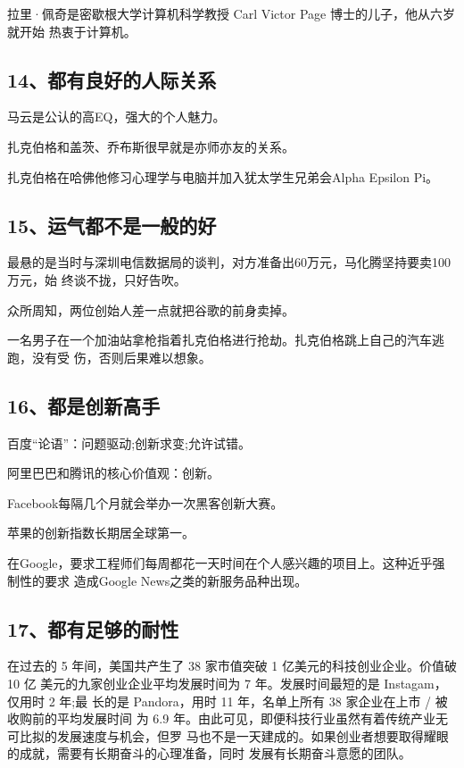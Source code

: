 \documentclass[11pt]{ctexart}
\begin{document}
{{{{拉里·佩奇是密歇根大学计算机科学教授 Carl Victor Page 博士的儿子，他从六岁就开始
热衷于计算机。

\subsection{14、都有良好的人际关系}
\label{sec:org9c956d6}

马云是公认的高EQ，强大的个人魅力。

扎克伯格和盖茨、乔布斯很早就是亦师亦友的关系。

扎克伯格在哈佛他修习心理学与电脑并加入犹太学生兄弟会Alpha Epsilon Pi。

\subsection{15、运气都不是一般的好}
\label{sec:orgf60fccc}

最悬的是当时与深圳电信数据局的谈判，对方准备出60万元，马化腾坚持要卖100万元，始
终谈不拢，只好告吹。

众所周知，两位创始人差一点就把谷歌的前身卖掉。

一名男子在一个加油站拿枪指着扎克伯格进行抢劫。扎克伯格跳上自己的汽车逃跑，没有受
伤，否则后果难以想象。

\subsection{16、都是创新高手}
\label{sec:org902fa3f}

百度“论语”：问题驱动;创新求变;允许试错。

阿里巴巴和腾讯的核心价值观：创新。

Facebook每隔几个月就会举办一次黑客创新大赛。

苹果的创新指数长期居全球第一。

在Google，要求工程师们每周都花一天时间在个人感兴趣的项目上。这种近乎强制性的要求
造成Google News之类的新服务品种出现。

\subsection{17、都有足够的耐性}
\label{sec:org9df2e61}

在过去的 5 年间，美国共产生了 38 家市值突破 1 亿美元的科技创业企业。价值破 10 亿
美元的九家创业企业平均发展时间为 7 年。发展时间最短的是 Instagam，仅用时 2 年;最
长的是 Pandora，用时 11 年，名单上所有 38 家企业在上市 / 被收购前的平均发展时间
为 6.9 年。由此可见，即便科技行业虽然有着传统产业无可比拟的发展速度与机会，但罗
马也不是一天建成的。如果创业者想要取得耀眼的成就，需要有长期奋斗的心理准备，同时
发展有长期奋斗意愿的团队。

}}}}
\end{document}
